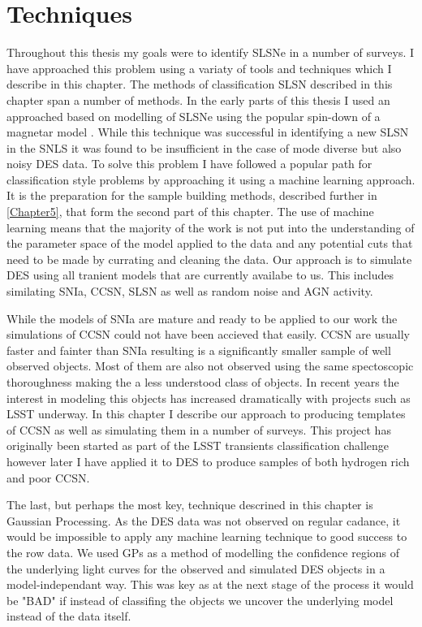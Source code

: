 \chapter{Techniques}
\label{Chapter4}

Throughout this thesis my goals were to identify SLSNe in a number of surveys. I have approached this problem using a variaty of tools and techniques which I describe in this chapter. The methods of classification SLSN described in this chapter span a number of methods. In the early parts of this thesis I used an approached based on modelling of SLSNe using the popular spin-down of a magnetar model . While this technique was successful in identifying a new SLSN in the SNLS it was found to be insufficient in the case of mode diverse but also noisy DES data. To solve this problem I have followed a popular path for classification style problems by approaching it using a machine learning approach. It is the preparation for the sample building methods, described further in \cref{Chapter5}, that form the second part of this chapter. The use of machine learning means that the majority of the work is not put into the understanding of the parameter space of the model applied to the data and any potential cuts that need to be made by currating and cleaning the data. Our approach is to simulate DES using all tranient models that are currently availabe to us. This includes similating SNIa, CCSN, SLSN as well as random noise and AGN activity.

While the models of SNIa are mature and ready to be applied to our work the simulations of CCSN could not have been accieved that easily. CCSN are usually faster and fainter than SNIa resulting is a significantly smaller sample of well observed objects. Most of them are also not observed using the same spectoscopic thoroughness making the a less understood class of objects. In recent years the interest in modeling this objects has increased dramatically with projects such as LSST underway. In this chapter I describe our approach to producing templates of CCSN as well as simulating them in a number of surveys. This project has originally been started as part of the LSST transients classification challenge however later I have applied it to DES to produce samples of both hydrogen rich and poor CCSN.

The last, but perhaps the most key, technique descrined in this chapter is Gaussian Processing. As the DES data was not observed on regular cadance, it would be impossible to apply any machine learning technique to good success to the row data. We used GPs as a method of modelling the confidence regions of the underlying light curves for the observed and simulated DES objects in a model-independant way. This was key as at the next stage of the process it would be "BAD" if instead of classifing the objects we uncover the underlying model instead of the data itself.


